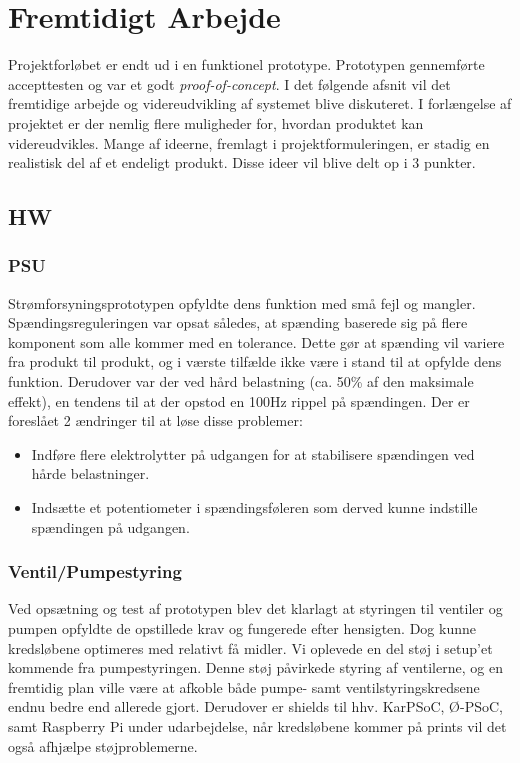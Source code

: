 \section{Fremtidigt Arbejde}
Projektforløbet er endt ud i en funktionel prototype. Prototypen gennemførte accepttesten og var et godt \emph{proof-of-concept}. I det følgende afsnit vil det fremtidige arbejde og videreudvikling af systemet blive diskuteret. I forlængelse af projektet er der nemlig flere muligheder for, hvordan produktet kan videreudvikles. Mange af ideerne, fremlagt i projektformuleringen, er stadig en realistisk del af et endeligt produkt. Disse ideer vil blive delt op i 3 punkter.\newline

\subsection{HW}
\subsubsection{PSU}
Strømforsyningsprototypen opfyldte dens funktion med små fejl og mangler. Spændingsreguleringen var opsat således, at spænding baserede sig på flere komponent som alle kommer med en tolerance. Dette gør at spænding vil variere fra produkt til produkt, og i værste tilfælde ikke være i stand til at opfylde dens funktion. Derudover var der ved hård belastning (ca. 50\% af den maksimale effekt), en tendens til at der opstod en 100Hz rippel på spændingen. Der er foreslået 2 ændringer til at løse disse problemer:\newline

\begin{itemize}
\item Indføre flere elektrolytter på udgangen for at stabilisere spændingen ved hårde belastninger.
\item Indsætte et potentiometer i spændingsføleren som derved kunne indstille spændingen på udgangen.
\end{itemize}

\subsubsection{Ventil/Pumpestyring}
Ved opsætning og test af prototypen blev det klarlagt at styringen til ventiler og pumpen opfyldte de opstillede krav og fungerede efter hensigten. Dog kunne kredsløbene optimeres med relativt få midler. Vi oplevede en del støj i setup'et kommende fra pumpestyringen. Denne støj påvirkede styring af ventilerne, og en fremtidig plan ville være at afkoble både pumpe- samt ventilstyringskredsene endnu bedre end allerede gjort. Derudover er shields til hhv. KarPSoC, Ø-PSoC, samt Raspberry Pi under udarbejdelse, når kredsløbene kommer på prints vil det også afhjælpe støjproblemerne.\newline


